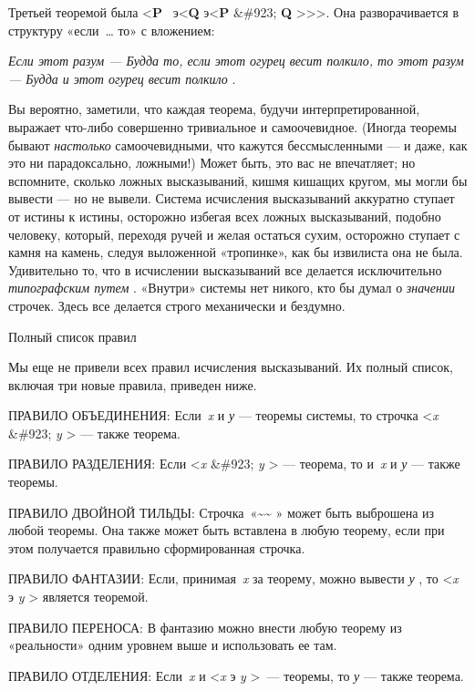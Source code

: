 Третьей теоремой была \textless{}\textbf{P} ~э\textless{}\textbf{Q} э\textless{}\textbf{P} \&\#923; \textbf{Q} \textgreater\textgreater\textgreater. Она разворачивается в структуру «если~\ldots{} то» с вложением:

\emph{Если этот разум --- Будда то, если этот огурец весит полкило, то этот разум --- Будда и этот огурец весит полкило} .

Вы вероятно, заметили, что каждая теорема, будучи интерпретированной, выражает что-либо совершенно тривиальное и самоочевидное. (Иногда теоремы бывают \emph{настолько} самоочевидными, что кажутся бессмысленными --- и даже, как это ни парадоксально, ложными!) Может быть, это вас не впечатляет; но вспомните, сколько ложных высказываний, кишмя кишащих кругом, мы могли бы вывести --- но не вывели. Система исчисления высказываний аккуратно ступает от истины к истины, осторожно избегая всех ложных высказываний, подобно человеку, который, переходя ручей и желая остаться сухим, осторожно ступает с камня на камень, следуя выложенной «тропинке», как бы извилиста она не была. Удивительно то, что в исчислении высказываний все делается исключительно \emph{типографским путем} . «Внутри» системы нет никого, кто бы думал о \emph{значении} строчек. Здесь все делается строго механически и бездумно.

Полный список правил

Мы еще не привели всех правил исчисления высказываний. Их полный список, включая три новые правила, приведен ниже.

ПРАВИЛО ОБЪЕДИНЕНИЯ: Если~\emph{x} и \emph{у} --- теоремы системы, то строчка \textless{}\emph{x} \&\#923; \emph{y} \textgreater{} --- также теорема.

ПРАВИЛО РАЗДЕЛЕНИЯ: Если \textless{}\emph{x} \&\#923; \emph{y} \textgreater{} --- теорема, то и~\emph{x} и \emph{у} --- также теоремы.

ПРАВИЛО ДВОЙНОЙ ТИЛЬДЫ: Строчка~«\textbf{\textasciitilde\textasciitilde{}} » может быть выброшена из любой теоремы. Она также может быть вставлена в любую теорему, если при этом получается правильно сформированная строчка.

ПРАВИЛО ФАНТАЗИИ: Если, принимая~\emph{x} за теорему, можно вывести \emph{у} , то \textless{}\emph{x} э \emph{y} \textgreater{} является теоремой.

ПРАВИЛО ПЕРЕНОСА: В фантазию можно внести любую теорему из «реальности» одним уровнем выше и использовать ее там.

ПРАВИЛО ОТДЕЛЕНИЯ: Если~\emph{x} и \textless{}\emph{x} э \emph{y} \textgreater~--- теоремы, то \emph{у} --- также теорема.

